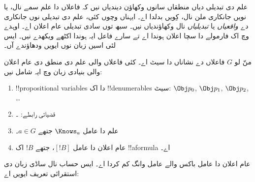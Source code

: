 \documentclass[../../../include/open-logic-section]{subfiles}
\begin{document}


علم دی تبدیلی دیاں منطقاں سانوں وکھاؤن دیندیاں نیں کہ فاعلاں دا
علم سمے نال، یا نویں جانکاری ملن نال، کِویں بدلدا اے۔ ایہناں وچوں
کئی، علم دی تبدیلی نوں جانکاری دے \emph{واقعیاں} یا \emph{تبدیلیاں}
نال وکھاؤندیاں نیں۔ سبھ توں سادی تبدیلی عام اعلان اے۔ اوہدے وچ اک
فارمولے دا سچا اعلان ہوندا اے تے سارے فاعل ایہ ہوندا اکٹھے ویکھدے
نیں۔ ایس لئی اسیں زبان نوں ایویں ودھاؤندے آں۔

\begin{defn}
منّ لو $G$ فاعلاں دے نشاناں دا سیٹ اے۔ کئی فاعلاں والی علم دی منطق
دی عام اعلان والی بنیادی زبان وچ ایہ شامل نیں:
\begin{enumerate}
  \item !!{propositional variable}s دا اک !!{denumerable}s سیٹ: $\Obj
    p_0$, $\Obj p_1$, $\Obj p_2$, \dots
  \item قضیاتی رابطے: \startycommalist
  ۔
  \item علم دا عامل $\Knows_a$ جتھے $a \in G$۔
  \item عام اعلان دا عامل $[!B]$، جتھے $!B$ اک !!a{formula} اے۔
\end{enumerate}
\end{defn}

عام اعلان دا عامل باکس والے عامل وانگ کم کردا اے۔ ایس حساب نال
ساڈی زبان دی استقرائی تعریف ایویں اے:
\end{document}
